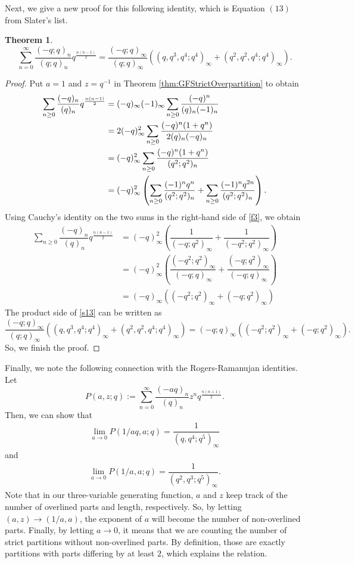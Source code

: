 \documentclass[12pt]{amsart}
\newtheorem{theorem}{Theorem}[section]
\theoremstyle{definition}
\theoremstyle{remark}
\numberwithin{equation}{section}
\begin{document}
Next, we give a new proof for this following identity, which is Equation $(13)$ from Slater's list.
\begin{theorem}
\begin{equation}\label{s13}
\sum_{n=0}^{\infty}\frac{(-q;q)_{n}}{(q;q)_{n}}q^{\frac{n(n-1)}{2}}=\frac{(-q;q)_{\infty}}{(q;q)_{\infty}}\left((q,q^3,q^4;q^4)_{\infty}+(q^2,q^2,q^4;q^4)_{\infty}\right).
\end{equation}
\end{theorem}
\begin{proof} 
Put $a=1$ and $z=q^{-1}$ in Theorem \ref{thm:GFStrictOverpartition} to obtain
\begin{align}\label{f3}
\sum_{n\ge 0}\dfrac{(-q)_n}{(q)_n}q^{\frac{n(n-1)}{2}}&=(-q)_\infty(-1)_\infty\sum_{n\geq 0}\dfrac{(-q)^n}{(q)_n(-1)_n}\notag\\
&=2(-q)_\infty^2\sum_{n\ge 0}\dfrac{(-q)^n(1+q^n)}{2(q)_n(-q)_n}\notag\\
&=(-q)_\infty^2\sum_{n\ge 0}\dfrac{(-q)^n(1+q^n)}{(q^2;q^2)_n}\notag\\
&=(-q)_\infty^2\left(\sum_{n\ge 0}\dfrac{(-1)^nq^n}{(q^2;q^2)_n}+\sum_{n\ge 0}\dfrac{(-1)^nq^{2n}}{(q^2;q^2)_n}\right).
\end{align}
Using Cauchy's identity \cite[p. $17$, $(2.2.1)$]{A} on the two sums in the right-hand side of \eqref{f3}, we obtain
\begin{align*}
\sum_{n\ge 0}\dfrac{(-q)_n}{(q)_n}q^{\frac{n(n-1)}{2}}&=(-q)_\infty^2\left(\dfrac{1}{(-q;q^2)_\infty}+\dfrac{1}{(-q^2;q^2)_\infty}\right)\\
&=(-q)_\infty^2\left(\dfrac{(-q^2;q^2)_\infty}{(-q;q)_\infty}+\dfrac{(-q;q^2)_\infty}{(-q;q)_\infty}\right)\\
&=(-q)_\infty\left((-q^2;q^2)_\infty+(-q;q^2)_\infty\right)
\end{align*}
The product side of \eqref{s13} can be written as
$$\frac{(-q;q)_{\infty}}{(q;q)_{\infty}}\left((q,q^3,q^4;q^4)_{\infty}+(q^2,q^2,q^4;q^4)_{\infty}\right)=(-q;q)_{\infty}\left((-q^2;q^2)_{\infty}+(-q;q^2)_{\infty}\right).$$
So, we finish the proof.
\end{proof}
Finally, we note the following connection with the Rogers-Ramanujan identities. Let
$$P(a,z;q) := {\displaystyle\sum\limits_{n=0}^{\infty}\dfrac{(-aq)_n}{(q)_n}z^nq^\frac{n(n+1)}{2}}.$$
Then, we can show that
\begin{align}
\lim\limits_{a\rightarrow 0}P(1/aq,a;q) = \dfrac{1}{(q,q^4;q^5)_{\infty}}    
\end{align}
and
\begin{align}
\lim\limits_{a\rightarrow 0}P(1/a,a;q) = \dfrac{1}{(q^2,q^3;q^5)_{\infty}}.   
\end{align}
Note that in our three-variable generating function, $a$ and $z$ keep track of the number of overlined parts and length, respectively. So, by letting $(a,z)\to(1/a,a)$, the exponent of $a$ will become the number of non-overlined parts. Finally, by letting $a\to0$, it means that we are counting the number of strict partitions without non-overlined parts. By definition, those are exactly partitions with parts differing by at least $2$, which explains the relation.
\end{document}
